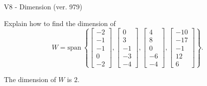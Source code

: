 \begin{exercise}
  \begin{exerciseTitle}V8 - Dimension (ver. 979)\end{exerciseTitle}
  \begin{exerciseStatement}
    Explain how to find the dimension of 
\[W=\mathrm{span}\ \left\{\left[\begin{array}{r}
-2 \\
-1 \\
-1 \\
0 \\
-2
\end{array}\right] , \left[\begin{array}{r}
0 \\
3 \\
-1 \\
-3 \\
-4
\end{array}\right] , \left[\begin{array}{r}
4 \\
8 \\
0 \\
-6 \\
-4
\end{array}\right] , \left[\begin{array}{r}
-10 \\
-17 \\
-1 \\
12 \\
6
\end{array}\right]\right\}.\]



  \end{exerciseStatement}
  \begin{exerciseAnswer}
   The dimension of \(W\) is  \(2\).
  


  \end{exerciseAnswer}
\end{exercise}